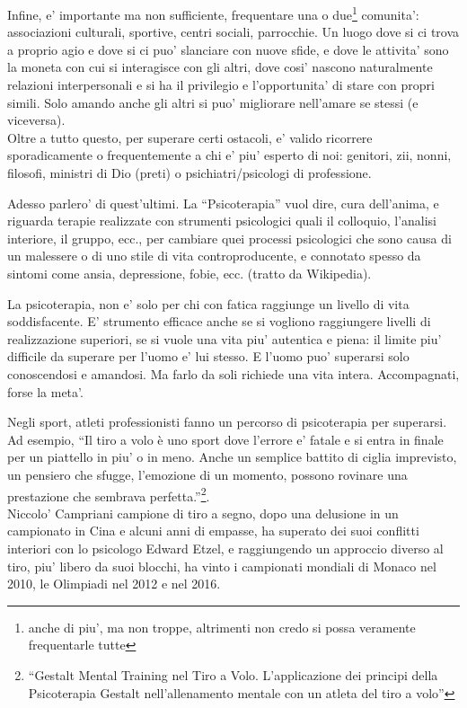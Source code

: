 Infine, e' importante ma non sufficiente, frequentare una o due\footnote{anche di piu', ma non troppe, altrimenti non credo si possa veramente frequentarle tutte} comunita': associazioni culturali, sportive, centri sociali, parrocchie. Un luogo dove si ci trova a proprio agio e dove si ci puo' slanciare con nuove sfide, e dove le attivita' sono la moneta con cui si interagisce con gli altri, dove cosi' nascono naturalmente relazioni interpersonali e si ha il privilegio e l'opportunita' di stare con propri simili. Solo amando anche gli altri si puo' migliorare nell'amare se stessi (e viceversa).\\

Oltre a tutto questo, per superare certi ostacoli, e' valido ricorrere sporadicamente o frequentemente a chi e' piu' esperto di noi: genitori, zii, nonni, filosofi, ministri di Dio (preti) o psichiatri/psicologi di professione.

Adesso parlero' di quest'ultimi. La ``Psicoterapia'' vuol dire, cura dell'anima, e riguarda terapie realizzate con strumenti psicologici quali il colloquio, l'analisi interiore, il gruppo, ecc., per cambiare quei processi psicologici che sono causa di un malessere o di uno stile di vita controproducente, e connotato spesso da sintomi come ansia, depressione, fobie, ecc. (tratto da Wikipedia).

La psicoterapia, non e' solo per chi con fatica raggiunge un livello di vita soddisfacente. E' strumento efficace anche se si vogliono raggiungere livelli di realizzazione superiori, se si vuole una vita piu' autentica e piena: il limite piu' difficile da superare per l'uomo e' lui stesso. E l'uomo puo' superarsi solo conoscendosi e amandosi. Ma farlo da soli richiede una vita intera. Accompagnati, forse la meta'.

Negli sport, atleti professionisti fanno un percorso di psicoterapia per superarsi. Ad esempio, ``Il tiro a volo è uno sport dove l’errore e' fatale e si entra in finale per un piattello in piu' o in meno. Anche un semplice battito di ciglia imprevisto, un pensiero che sfugge, l’emozione di un momento, possono rovinare una prestazione che sembrava perfetta.''\footnote{ ``Gestalt Mental Training nel Tiro a Volo. L'applicazione dei principi della Psicoterapia Gestalt nell'allenamento mentale con un atleta del tiro a volo''}.\\
Niccolo' Campriani campione di tiro a segno, dopo una delusione in un campionato in Cina e alcuni anni di empasse, ha superato dei suoi conflitti interiori con lo psicologo Edward Etzel, e raggiungendo un approccio diverso al tiro, piu' libero da suoi blocchi, ha vinto i campionati mondiali di Monaco nel 2010, le Olimpiadi nel 2012 e nel 2016.\\

